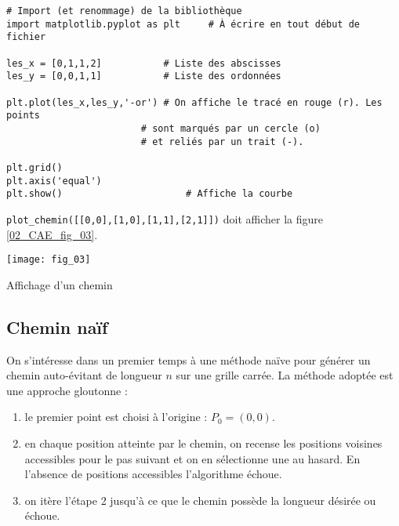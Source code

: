 \begin{lstlisting}
# Import (et renommage) de la bibliothèque 
import matplotlib.pyplot as plt		# À écrire en tout début de fichier

les_x = [0,1,1,2]			# Liste des abscisses
les_y = [0,0,1,1]			# Liste des ordonnées

plt.plot(les_x,les_y,'-or')	# On affiche le tracé en rouge (r). Les points 
						# sont marqués par un cercle (o) 
						# et reliés par un trait (-). 

plt.grid()
plt.axis('equal')
plt.show() 						# Affiche la courbe

\end{lstlisting}





\begin{test}
\lstinline{plot_chemin([[0,0],[1,0],[1,1],[2,1]])} doit afficher la figure \ref{02_CAE_fig_03}.
\end{test}


\begin{marginfigure}
\texttt{[image: fig\_03]}
\caption{Affichage d'un chemin \label{02_CAE_fig_03}}
\end{marginfigure}





\subsection*{Chemin naïf} 


On s’intéresse dans un premier temps à une méthode naïve pour générer un chemin auto-évitant de longueur
$n$ sur une grille carrée. La méthode adoptée est une approche gloutonne :
\begin{enumerate}
\item le premier point est choisi à l’origine : $P_0 = \left(0, 0\right)$.
\item en chaque position atteinte par le chemin, on recense les positions voisines accessibles pour le pas
suivant et on en sélectionne une au hasard. En l’absence de positions accessibles l’algorithme échoue.
\item on itère l’étape 2 jusqu’à ce que le chemin possède la longueur désirée ou échoue.
\end{enumerate}





